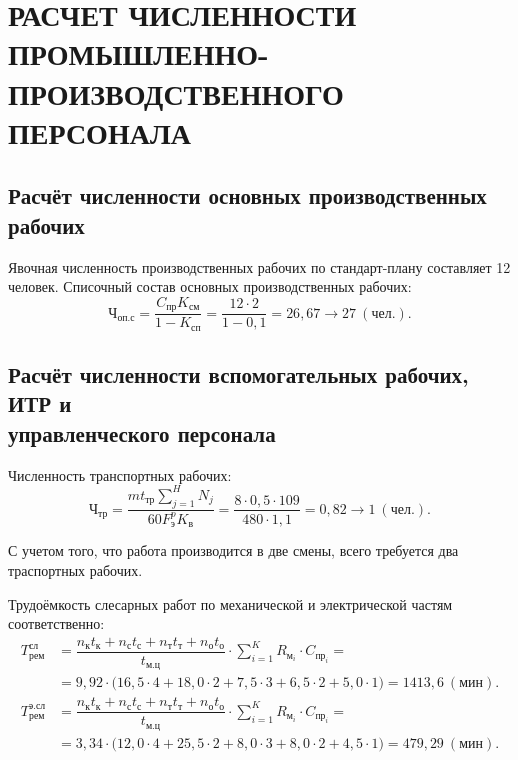 \section[%
Расчёт численности промышленно-производственного персонала]{%
РАСЧЕТ ЧИСЛЕННОСТИ \\
ПРОМЫШЛЕННО-ПРОИЗВОДСТВЕННОГО \\
ПЕРСОНАЛА
}
\label{sec:number}

\subsection[%
Расчёт численности основных производственных рабочих
]{%
Расчёт численности основных производственных рабочих
}

Явочная численность производственных рабочих по стандарт-плану
составляет 12 человек.
Списочный состав основных производственных рабочих:
\begin{equation*}
  \text{Ч}_{\text{оп.с}} = 
    \dfrac{C_{\text{пр}}K_{см}}{1-K_{\text{сп}}} =
    \dfrac{12 \cdot 2}{1-0{,}1} =
    26{,}67 \rightarrow 27 \: (\text{чел.}).
\end{equation*}

\subsection[%
Расчёт численности вспомогательных рабочих, ИТР и \\
управленческого персонала
]{%
Расчёт численности вспомогательных рабочих, ИТР и \\
управленческого персонала
}

Численность транспортных рабочих:
\begin{equation*}
  \text{Ч}_{\text{тр}} = 
  \dfrac{m t_{\text{тр}} \sum^H_{j=1} N_j}{60 F^p_{\text{э}} K_{\text{в}}} =
  \dfrac{8 \cdot 0{,}5 \cdot 109}{480 \cdot 1{,}1} =
  0{,}82 \rightarrow 1 \: (\text{чел.}).
\end{equation*}

С учетом того, что работа производится в две смены, 
всего требуется два траспортных рабочих.

Трудоёмкость слесарных работ по механической и электрической частям соответственно:
{\small
\begin{align*}
  T^{\text{сл}}_{\text{рем}} &= 
  \dfrac{
    n_{\text{к}}t_{\text{к}} + n_{\text{с}}t_{\text{с}} +
    n_{\text{т}}t_{\text{т}} + n_{\text{о}}t_{\text{о}}
  }{
    t_{\text{м.ц}}
  } \cdot \sum^K_{i=1} R_{\text{м}_i} \cdot C_{\text{пр}_i} = \\
  &= 9{,}92
    \cdot
    \big(
      16{,}5 \cdot 4 + 18{,}0 \cdot 2 + 7{,}5 \cdot 3 + 
      6{,}5 \cdot 2 + 5{,}0 \cdot 1
    \big) =
    1413{,}6 \: (\text{мин}). 
  \\
  T^{\text{э.сл}}_{\text{рем}} &= 
  \dfrac{
    n_{\text{к}}t_{\text{к}} + n_{\text{с}}t_{\text{с}} +
    n_{\text{т}}t_{\text{т}} + n_{\text{о}}t_{\text{о}}
  }{
    t_{\text{м.ц}}
  } \cdot \sum^K_{i=1} R_{\text{м}_i} \cdot C_{\text{пр}_i} = \\
  &= 3{,}34
    \cdot
    \big(
      12{,}0 \cdot 4 + 25{,}5 \cdot 2 + 8{,}0 \cdot 3 + 
      8{,}0 \cdot 2 + 4{,}5 \cdot 1
    \big) =
    479{,}29 \: (\text{мин}).
\end{align*}
}


